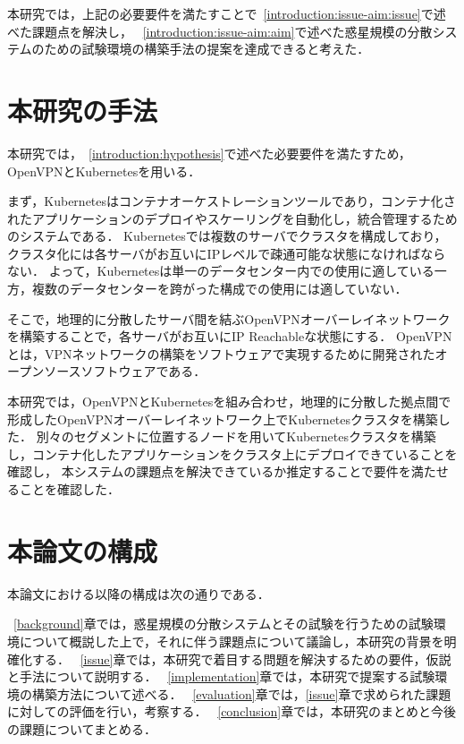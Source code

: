 本研究では，上記の必要要件を満たすことで~\ref{introduction:issue-aim:issue}で述べた課題点を解決し，
~\ref{introduction:issue-aim:aim}で述べた惑星規模の分散システムのための試験環境の構築手法の提案を達成できると考えた．

\section{本研究の手法}
\label{introduction:proposal}

本研究では，~\ref{introduction:hypothesis}で述べた必要要件を満たすため，OpenVPNとKubernetesを用いる．

まず，Kubernetesはコンテナオーケストレーションツールであり，コンテナ化されたアプリケーションのデプロイやスケーリングを自動化し，統合管理するためのシステムである．
Kubernetesでは複数のサーバでクラスタを構成しており，クラスタ化には各サーバがお互いにIPレベルで疎通可能な状態になければならない．
よって，Kubernetesは単一のデータセンター内での使用に適している一方，複数のデータセンターを跨がった構成での使用には適していない．

そこで，地理的に分散したサーバ間を結ぶOpenVPNオーバーレイネットワークを構築することで，各サーバがお互いにIP Reachableな状態にする．
OpenVPNとは，VPNネットワークの構築をソフトウェアで実現するために開発されたオープンソースソフトウェアである．

本研究では，OpenVPNとKubernetesを組み合わせ，地理的に分散した拠点間で形成したOpenVPNオーバーレイネットワーク上でKubernetesクラスタを構築した．
別々のセグメントに位置するノードを用いてKubernetesクラスタを構築し，コンテナ化したアプリケーションをクラスタ上にデプロイできていることを確認し，
本システムの課題点を解決できているか推定することで要件を満たせることを確認した．

\section{本論文の構成}
\label{introduction:structure}

本論文における以降の構成は次の通りである．

~\ref{background}章では，惑星規模の分散システムとその試験を行うための試験環境について概説した上で，それに伴う課題点について議論し，本研究の背景を明確化する．
~\ref{issue}章では，本研究で着目する問題を解決するための要件，仮説と手法について説明する．
~\ref{implementation}章では，本研究で提案する試験環境の構築方法について述べる．
~\ref{evaluation}章では，\ref{issue}章で求められた課題に対しての評価を行い，考察する．
~\ref{conclusion}章では，本研究のまとめと今後の課題についてまとめる．

